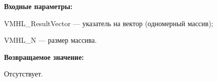 \textbf{Входные параметры:} 
 
VMHL\_ResultVector --- указатель на вектор (одномерный массив);
 
VMHL\_N --- размер массива.

\textbf{Возвращаемое значение:}

Отсутствует.